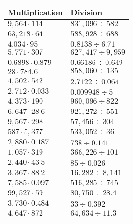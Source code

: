 \begin{longtable}[]{@{}ll@{}}
\toprule
Multiplication & Division\tabularnewline
\midrule
\endhead
\(9,564\cdot114\) & \(831,096÷582\)\tabularnewline
\(63,218\cdot64\) & \(588,928÷688\)\tabularnewline
\(4.034\cdot95\) & \(0.8138 ÷6.71\)\tabularnewline
\(5,771\cdot307\) & \(627,417÷9,959\)\tabularnewline
\(0.6898\cdot0.879\) & \(0.66186÷0.649\)\tabularnewline
\(28\cdot784.6\) & \(858,060÷135\)\tabularnewline
\(4,502\cdot542\) & \(2.7122÷0.064\)\tabularnewline
\(2,712\cdot0.033\) & \(0.009948÷5\)\tabularnewline
\(4,373\cdot190\) & \(960,096÷822\)\tabularnewline
\(6,647\cdot28.6\) & \(921,272÷551\)\tabularnewline
\(9,567\cdot298\) & \(57,456÷304\)\tabularnewline
\(587\cdot5,377\) & \(533,052÷36\)\tabularnewline
\(2,880\cdot0.187\) & \(738÷0.141\)\tabularnewline
\(1,057\cdot319\) & \(366,226÷101\)\tabularnewline
\(2,440\cdot43.5\) & \(85÷0.026\)\tabularnewline
\(3,367\cdot88.2\) & \(16,282÷8,141\)\tabularnewline
\(7,585\cdot0.097\) & \(516,285÷745\)\tabularnewline
\(99,527\cdot59\) & \(80,750÷28.4\)\tabularnewline
\(3,730\cdot0.484\) & \(33÷0.392\)\tabularnewline
\(4,647\cdot872\) & \(64,634÷11.3\)\tabularnewline
\bottomrule
\end{longtable}
